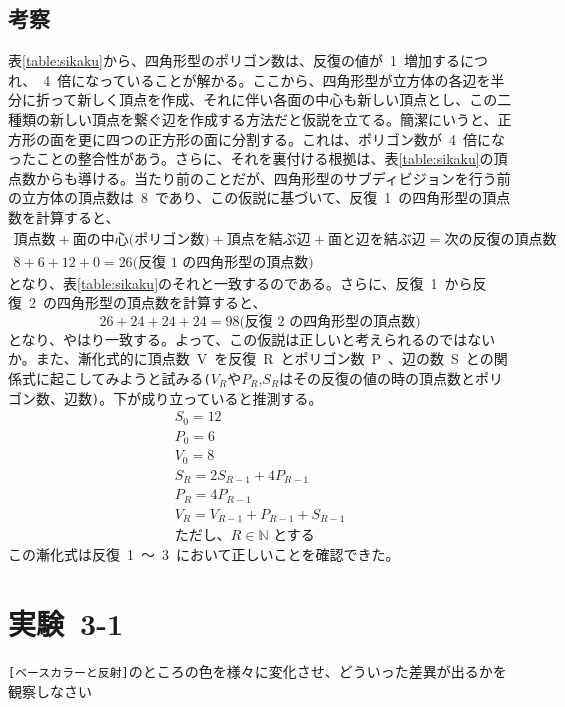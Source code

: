 \documentclass[a4j]{jarticle}
\begin{document}
\subsection{考察}
%
表\ref{table:sikaku}から、四角形型のポリゴン数は、反復の値が\ 1\ 増加するにつれ、\ 4\ 倍になっていることが解かる。ここから、四角形型が立方体の各辺を半分に折って新しく頂点を作成、それに伴い各面の中心も新しい頂点とし、この二種類の新しい頂点を繋ぐ辺を作成する方法だと仮説を立てる。簡潔にいうと、正方形の面を更に四つの正方形の面に分割する。これは、ポリゴン数が\ 4\ 倍になったことの整合性があう。さらに、それを裏付ける根拠は、表\ref{table:sikaku}の頂点数からも導ける。当たり前のことだが、四角形型のサブディビジョンを行う前の立方体の頂点数は\ 8\ であり、この仮説に基づいて、反復\ 1\ の四角形型の頂点数を計算すると、
\begin{gather*}
  \textrm{頂点数} + \textrm{面の中心(ポリゴン数)} + \textrm{頂点を結ぶ辺} + \textrm{面と辺を結ぶ辺} = \textrm{次の反復の頂点数} \\
  8 + 6 + 12 + 0 = 26 \textrm{(反復 1 の四角形型の頂点数)}
\end{gather*}
となり、表\ref{table:sikaku}のそれと一致するのである。さらに、反復\ 1\ から反復\ 2\ の四角形型の頂点数を計算すると、
\begin{equation*}
  26 + 24 + 24 + 24 = 98 \textrm{(反復 2 の四角形型の頂点数)}
\end{equation*}
となり、やはり一致する。よって、この仮説は正しいと考えられるのではないか。また、漸化式的に頂点数\ V\ を反復\ R\ とポリゴン数\ P\ 、辺の数\ S\ との関係式に起こしてみようと試みる\verb|(|$V_{R}$や$P_{R}$,$S_{R}$はその反復の値の時の頂点数とポリゴン数、辺数\verb|)|。下が成り立っていると推測する。
\begin{gather*}
  S_{0} = 12 \\
  P_{0} = 6 \\
  V_{0} = 8 \\
  S_{R} = 2S_{R-1} + 4P_{R-1} \\
  P_{R} = 4P_{R-1} \\
  V_{R} = V_{R-1} + P_{R-1} + S_{R-1}\\
  \text{ただし、$R\in{\mathbb{N}}$ とする}
\end{gather*}
  この漸化式は反復\ 1\ ～\ 3\ において正しいことを確認できた。
%

\newpage
\section{実験\ 3-1}
\verb|[ベースカラーと反射]|のところの色を様々に変化させ、どういった差異が出るかを観察しなさい
\end{document}
